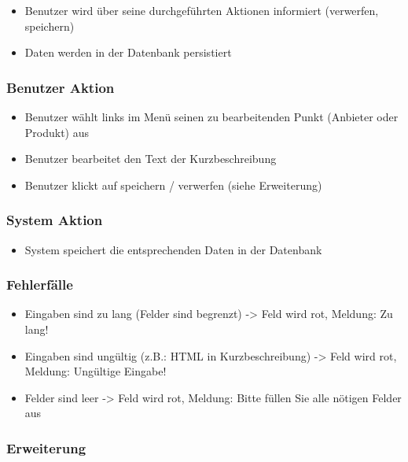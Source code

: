 \documentclass[a4paper,12pt]{article}
\begin{document}
\begin{itemize}
\item
  Benutzer wird über seine durchgeführten Aktionen informiert
  (verwerfen, speichern)
\item
  Daten werden in der Datenbank persistiert
\end{itemize}

\subsubsection{Benutzer Aktion}\label{benutzer-aktion-2}

\begin{itemize}
\item
  Benutzer wählt links im Menü seinen zu bearbeitenden Punkt (Anbieter
  oder Produkt) aus
\item
  Benutzer bearbeitet den Text der Kurzbeschreibung
\item
  Benutzer klickt auf speichern / verwerfen (siehe Erweiterung)
\end{itemize}

\subsubsection{System Aktion}\label{system-aktion-2}

\begin{itemize}
\item
  System speichert die entsprechenden Daten in der Datenbank
\end{itemize}

\subsubsection{Fehlerfälle}\label{fehlerfalle-2}

\begin{itemize}
\item
  Eingaben sind zu lang (Felder sind begrenzt) -\textgreater{} Feld wird
  rot, Meldung: Zu lang!
\item
  Eingaben sind ungültig (z.B.: HTML in Kurzbeschreibung)
  -\textgreater{} Feld wird rot, Meldung: Ungültige Eingabe!
\item
  Felder sind leer -\textgreater{} Feld wird rot, Meldung: Bitte füllen
  Sie alle nötigen Felder aus
\end{itemize}

\subsubsection{Erweiterung}\label{erweiterung-2}
\end{document}

